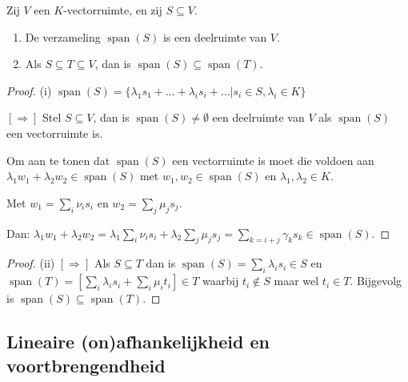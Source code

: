 \begin{lemma}[2.2.9]
    Zij $V$ een $K$-vectorruimte, en zij $S \subseteq V$.
    \begin{enumerate}
        \item[(i)] De verzameling $\operatorname{span}(S)$ is een deelruimte van $V$.
        \item[(ii)] Als $S \subseteq T \subseteq V$, dan is $\operatorname{span}(S) \subseteq \operatorname{span}(T)$.
    \end{enumerate}
\end{lemma}
\begin{proof}(i)
    \(\operatorname{span}(S) = \{\lambda_1s_1+ \dots + \lambda_is_i + \dots |s_i \in S, \lambda_i \in K \}\)

    \([\Rightarrow]\) Stel \(S \subseteq V\), dan is \(\operatorname{span}(S) \neq \emptyset\) een deelruimte van \(V\) als \(\operatorname{span}(S)\) een vectorruimte is.

    Om aan te tonen dat \(\operatorname{span}(S)\) een vectorruimte is moet die voldoen aan \(\lambda_1 w_1 + \lambda_2 w_2 \in \operatorname{span}(S)\) met \(w_1,w_2 \in \operatorname{span}(S) \)
    en \(\lambda_1,\lambda_2 \in K\).

    Met \(w_1 = \sum_{i} \nu_i s_i\) en \(w_2 = \sum_{j} \mu_j s_j\).

    Dan:
    \(\lambda_1 w_1 + \lambda_2 w_2 = \lambda_1 \sum_{i} \nu_i s_i + \lambda_2 \sum_{j} \mu_j s_j = \sum_{k=i+j} \gamma_k s_k \in \operatorname{span}(S) \).
\end{proof}
\begin{proof}(ii)
    \([\Rightarrow]\) Als \(S \subseteq T\) dan is \(\operatorname{span}(S) = \sum_{i} \lambda_i s_i \in S \)
    en \(\operatorname{span}(T) = \left[\sum_{i} \lambda_i s_i + \sum_{i} \mu_i t_i \right] \in T\)
    waarbij \(t_i \notin S\) maar wel \(t_i \in T\). Bijgevolg is \(\operatorname{span}(S) \subseteq \operatorname{span}(T)\).
\end{proof}

\subsection{Lineaire (on)afhankelijkheid en voortbrengendheid}

